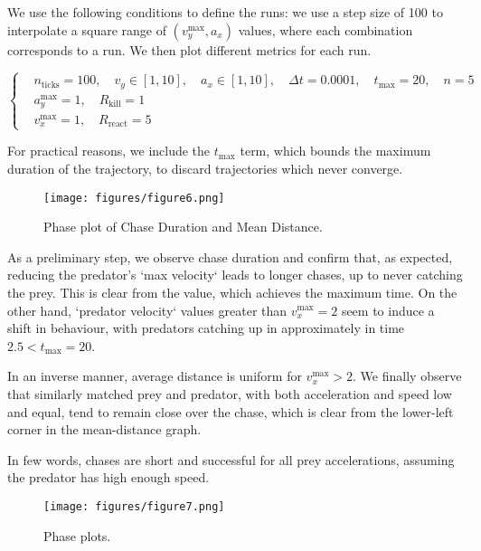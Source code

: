 \documentclass[11pt]{article}
\begin{document}
We use the following conditions to define the runs: we use a step size of 100 to interpolate a square range of $(v^\text{max}_y, a_x)$ values, where each combination corresponds to a run. We then plot different metrics for each run.

\[
\left\{
\begin{aligned}
&n_{\text{ticks}} = 100,\quad v_y \in [1, 10],\quad a_x \in [1, 10],\quad \Delta t = 0.0001,\quad t_{\text{max}} = 20,\quad n = 5 \\
&a^{\text{max}}_y = 1,\quad R_{\text{kill}} = 1 \\
&v^{\text{max}}_x = 1,\quad R_{\text{react}} = 5
\end{aligned}
\right.
\]

For practical reasons, we include the $t_{\text{max}}$ term, which bounds the maximum duration of the trajectory, to discard trajectories which never converge.

\begin{figure}[htbp]
  \centering
  \texttt{[image: figures/figure6.png]}
  \caption{Phase plot of Chase Duration and Mean Distance.}
  \label{fig:phaseplot1}
\end{figure}

As a preliminary step, we observe chase duration and confirm that, as expected, reducing the predator's `max velocity` leads to longer chases, up to never catching the prey. This is clear from the value, which achieves the maximum time. On the other hand, `predator velocity` values greater than $v_x^{\text{max}}=2$ seem to induce a shift in behaviour, with predators catching up in approximately in time $2.5 < t_{\text{max}} = 20$.

In an inverse manner, average distance is uniform for $v_x^{\text{max}}>2$. We finally observe that similarly matched prey and predator, with both acceleration and speed low and equal, tend to remain close over the chase, which is clear from the lower-left corner in the mean-distance graph.

In few words, chases are short and successful for all prey accelerations, assuming the predator has high enough speed.

\begin{figure}[htbp]
  \centering
  \texttt{[image: figures/figure7.png]}
  \caption{Phase plots.}
  \label{fig:phaseplot2}
\end{figure}
\end{document}
